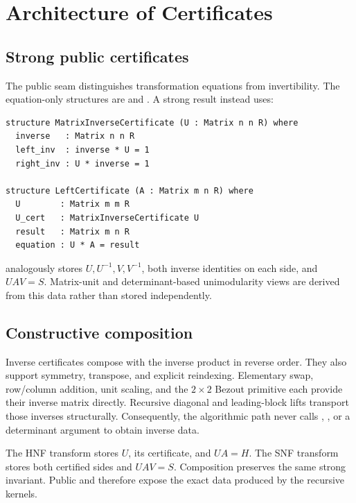 \section{Architecture of Certificates}
\label{sec:certificates}

\subsection{Strong public certificates}

The public seam distinguishes transformation equations from invertibility.
The equation-only structures are  and
. A strong result instead uses:

\begin{lstlisting}[style=leanstyle,caption={Explicit inverse certificate seam.}]
structure MatrixInverseCertificate (U : Matrix n n R) where
  inverse   : Matrix n n R
  left_inv  : inverse * U = 1
  right_inv : U * inverse = 1

structure LeftCertificate (A : Matrix m n R) where
  U        : Matrix m m R
  U_cert   : MatrixInverseCertificate U
  result   : Matrix m n R
  equation : U * A = result
\end{lstlisting}

 analogously stores \(U,U^{-1},V,V^{-1}\), both
inverse identities on each side, and \(UAV=S\). Matrix-unit and
determinant-based unimodularity views are derived from this data rather than
stored independently.

\subsection{Constructive composition}

Inverse certificates compose with the inverse product in reverse order. They
also support symmetry, transpose, and explicit reindexing. Elementary swap,
row/column addition, unit scaling, and the \(2\times2\) Bezout primitive each
provide their inverse matrix directly. Recursive diagonal and leading-block
lifts transport those inverses structurally. Consequently, the algorithmic
path never calls , , or a determinant
argument to obtain inverse data.

The HNF transform stores \(U\), its certificate, and \(UA=H\). The SNF
transform stores both certified sides and \(UAV=S\). Composition preserves the
same strong invariant. Public  and 
therefore expose the exact data produced by the recursive kernels.

